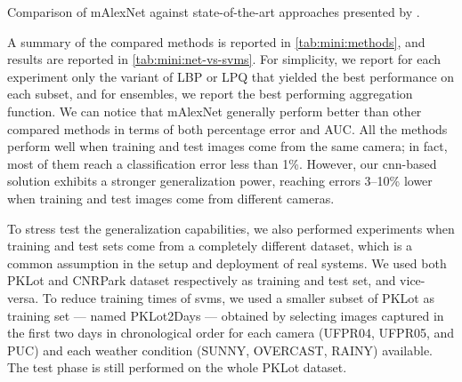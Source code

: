 \begin{table}
	\caption{Comparison of mAlexNet against state-of-the-art approaches presented by \citet{de2015pklot}.}
	\label{tab:mini:net-vs-svms}
\end{table}

A summary of the compared methods is reported in \ref{tab:mini:methods}, and results are reported in \ref{tab:mini:net-vs-svms}.
For simplicity, we report for each experiment only the variant of LBP or LPQ that yielded the best performance on each subset, and for ensembles, we report the best performing aggregation function.
We can notice that mAlexNet generally perform better than other compared methods in terms of both percentage error and AUC.
All the methods perform well when training and test images come from the same camera;
in fact, most of them reach a classification error less than 1\%.
However, our \gls{cnn}-based solution exhibits a stronger generalization power, reaching errors 3--10\% lower when training and test images come from different cameras.

To stress test the generalization capabilities, we also performed experiments when training and test sets come from a completely different dataset, which is a common assumption in the setup and deployment of real systems.
We used both PKLot and CNRPark dataset respectively as training and test set, and vice-versa.
To reduce training times of \glspl{svm}, we used a smaller subset of PKLot as training set --- named PKLot2Days --- obtained by selecting images captured in the first two days in chronological order for each camera (UFPR04, UFPR05, and PUC) and each weather condition (SUNNY, OVERCAST, RAINY) available.
The test phase is still performed on the whole PKLot dataset.

